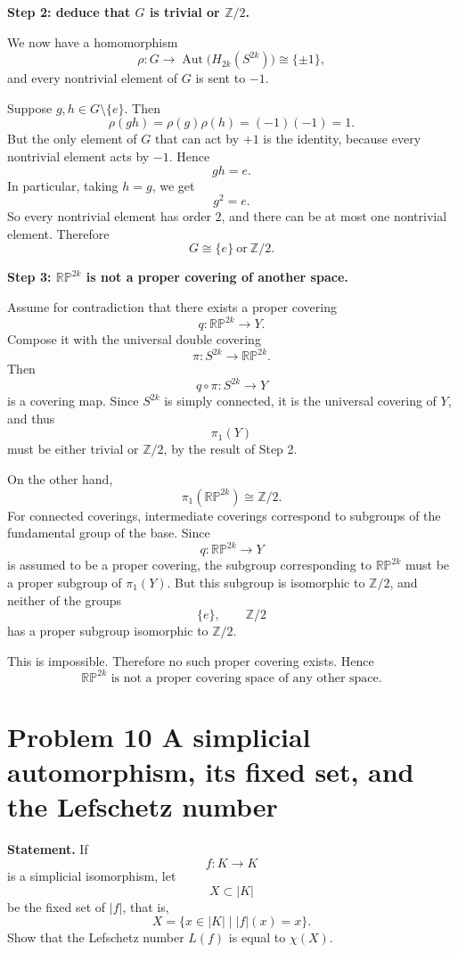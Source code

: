 \documentclass[12pt,a4paper]{article}
\theoremstyle{notespace}
\begin{document}
\medskip

\textbf{Step 2: deduce that \(G\) is trivial or \(\mathbb Z/2\).}

We now have a homomorphism
\[
\rho:G\to \operatorname{Aut}\bigl(H_{2k}(S^{2k})\bigr)\cong \{\pm 1\},
\]
and every nontrivial element of \(G\) is sent to \(-1\).

Suppose \(g,h\in G\setminus\{e\}\). Then
\[
\rho(gh)=\rho(g)\rho(h)=(-1)(-1)=1.
\]
But the only element of \(G\) that can act by \(+1\) is the identity, because every nontrivial element acts by \(-1\). Hence
\[
gh=e.
\]
In particular, taking \(h=g\), we get
\[
g^2=e.
\]
So every nontrivial element has order \(2\), and there can be at most one nontrivial element. Therefore
\[
\boxed{G\cong \{e\}\ \text{or}\ \mathbb Z/2.}
\]

\medskip

\textbf{Step 3: \(\mathbb{RP}^{2k}\) is not a proper covering of another space.}

Assume for contradiction that there exists a proper covering
\[
q:\mathbb{RP}^{2k}\to Y.
\]
Compose it with the universal double covering
\[
\pi:S^{2k}\to \mathbb{RP}^{2k}.
\]
Then
\[
q\circ \pi:S^{2k}\to Y
\]
is a covering map. Since \(S^{2k}\) is simply connected, it is the universal covering of \(Y\), and thus
\[
\pi_1(Y)
\]
must be either trivial or \(\mathbb Z/2\), by the result of Step 2.

On the other hand,
\[
\pi_1(\mathbb{RP}^{2k})\cong \mathbb Z/2.
\]
For connected coverings, intermediate coverings correspond to subgroups of the fundamental group of the base. Since
\[
q:\mathbb{RP}^{2k}\to Y
\]
is assumed to be a proper covering, the subgroup corresponding to \(\mathbb{RP}^{2k}\) must be a proper subgroup of \(\pi_1(Y)\). But this subgroup is isomorphic to \(\mathbb Z/2\), and neither of the groups
\[
\{e\},\qquad \mathbb Z/2
\]
has a proper subgroup isomorphic to \(\mathbb Z/2\).

This is impossible. Therefore no such proper covering exists. Hence
\[
\boxed{\mathbb{RP}^{2k}\text{ is not a proper covering space of any other space.}}
\]


\section{Problem 10 A simplicial automorphism, its fixed set, and the Lefschetz number}

\textbf{Statement.}
If
\[
f:K\to K
\]
is a simplicial isomorphism, let
\[
X\subset |K|
\]
be the fixed set of \(|f|\), that is,
\[
X=\{x\in |K| \mid |f|(x)=x\}.
\]
Show that the Lefschetz number \(L(f)\) is equal to \(\chi(X)\).
\end{document}
